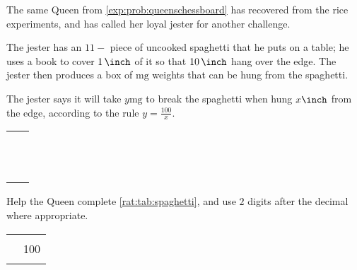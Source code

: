 \begin{problem}
The same Queen from \vref{exp:prob:queenschessboard} has recovered from 
the rice experiments, and has called her loyal jester for another challenge.

The jester has an $11-$\si{\inch} piece of uncooked spaghetti that he puts on a table; 
he uses a book to cover $\SI{1}{\inch}$ of it so that 
$\SI{10}{\inch}$ hang over the edge. The jester then produces a box of $\si{\milli\gram}$
weights that can be hung from the spaghetti.

The jester says it will take $y\si{\milli\gram}$ to break the spaghetti when hung
$x\si{\inch}$ from the edge, according to the rule $y=\frac{100}{x}$.
\begin{margintable}
	\centering
	\label{rat:tab:spaghetti}
	\begin{tabular}{S[table-format=2]c}
		\beforeheading
		 &  \\ 
		             &               \\             &               \\             &               \\             &               \\             &               \\             &               \\             &               \\             &               \\             &               \\            &               \\\lastline      
	\end{tabular}
\end{margintable}
\begin{subproblem}\label{rat:prob:spaggt1}
	Help the Queen complete \cref{rat:tab:spaghetti}, and use $2$ digits after the decimal
	where appropriate.
	\begin{shortsolution}
		\begin{tabular}[t]{S[table-format=2]S[table-format=3.2]}
			\beforeheading
			 &  \\    
			             & 100           \\\normalline  

\end{tabular}
\end{shortsolution}
\end{subproblem}
\end{problem}
